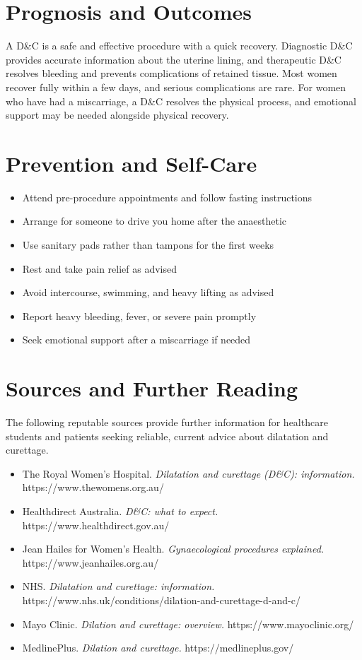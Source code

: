 \section*{Prognosis and Outcomes}
A D\&C is a safe and effective procedure with a quick recovery. Diagnostic D\&C provides accurate information about the uterine lining, and therapeutic D\&C resolves bleeding and prevents complications of retained tissue. Most women recover fully within a few days, and serious complications are rare. For women who have had a miscarriage, a D\&C resolves the physical process, and emotional support may be needed alongside physical recovery.

\section*{Prevention and Self-Care}
\begin{itemize}
    \item Attend pre-procedure appointments and follow fasting instructions
    \item Arrange for someone to drive you home after the anaesthetic
    \item Use sanitary pads rather than tampons for the first weeks
    \item Rest and take pain relief as advised
    \item Avoid intercourse, swimming, and heavy lifting as advised
    \item Report heavy bleeding, fever, or severe pain promptly
    \item Seek emotional support after a miscarriage if needed
\end{itemize}

\section*{Sources and Further Reading}
The following reputable sources provide further information for healthcare students and patients seeking reliable, current advice about dilatation and curettage.

\begin{itemize}
    \item The Royal Women's Hospital. \textit{Dilatation and curettage (D\&C): information.} https://www.thewomens.org.au/
    \item Healthdirect Australia. \textit{D\&C: what to expect.} https://www.healthdirect.gov.au/
    \item Jean Hailes for Women's Health. \textit{Gynaecological procedures explained.} https://www.jeanhailes.org.au/
    \item NHS. \textit{Dilatation and curettage: information.} https://www.nhs.uk/conditions/dilation-and-curettage-d-and-c/
    \item Mayo Clinic. \textit{Dilation and curettage: overview.} https://www.mayoclinic.org/
    \item MedlinePlus. \textit{Dilation and curettage.} https://medlineplus.gov/
\end{itemize}
